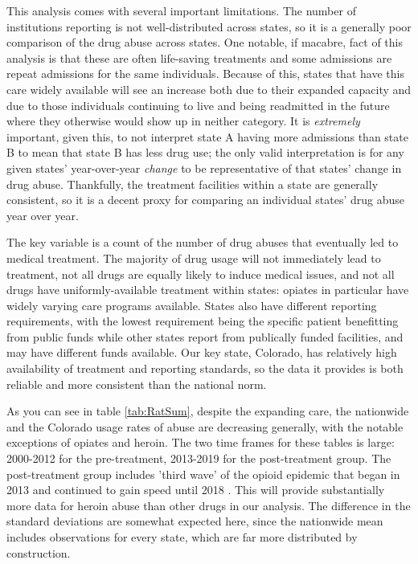 \documentclass{article}
\begin{document}
This analysis comes with several important limitations. The number of institutions reporting is not well-distributed across states, so it is a generally poor comparison of the drug abuse across states. One notable, if macabre, fact of this analysis is that these are often life-saving treatments and some admissions are repeat admissions for the same individuals. Because of this, states that have this care widely available will see an increase both due to their expanded capacity and due to those individuals continuing to live and being readmitted in the future where they otherwise would show up in neither category. It is \emph{extremely} important, given this, to not interpret state A having more admissions than state B to mean that state B has less drug use; the only valid interpretation is for any given states' year-over-year \emph{change} to be representative of that states' change in drug abuse. Thankfully, the treatment facilities within a state are generally consistent, so it is a decent proxy for comparing an individual states' drug abuse year over year. 

The key variable is a count of the number of drug abuses that eventually led to medical treatment. The majority of drug usage will not immediately lead to treatment, not all drugs are equally likely to induce medical issues, and not all drugs have uniformly-available treatment within states: opiates in particular have widely varying care programs available. States also have different reporting requirements, with the lowest requirement being the specific patient benefitting from public funds while other states report from publically funded facilities, and may have different funds available. Our key state, Colorado, has relatively high availability of treatment and reporting standards, so the data it provides is both reliable and more consistent than the national norm.



As you can see in table \ref{tab:RatSum}, despite the expanding care, the nationwide and the Colorado usage rates of abuse are decreasing generally, with the notable exceptions of opiates and heroin.  The two time frames for these tables is large: 2000-2012 for the pre-treatment, 2013-2019 for the post-treatment group. The post-treatment group includes 'third wave' of the opioid epidemic that began in 2013 and continued to gain speed until 2018 \citep{CDCOpEpi}. This will provide substantially more data for heroin abuse than other drugs in our analysis. The difference in the standard deviations are somewhat expected here, since the nationwide mean includes observations for every state, which are far more distributed by construction.
\end{document}
